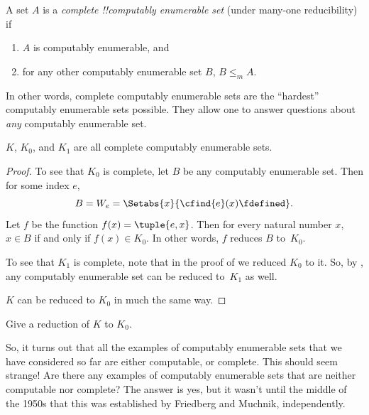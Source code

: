 \documentclass[../../../include/open-logic-section]{subfiles}
\begin{document}

\begin{defn}
A set $A$ is a \emph{complete !!{computably enumerable} set}
(under many-one reducibility) if
\begin{enumerate}
\item $A$ is computably enumerable, and
\item for any other computably enumerable set $B$, $B \leq_m A$.
\end{enumerate}
\end{defn}

In other words, complete computably enumerable sets are the
``hardest'' computably enumerable sets possible. They allow one to
answer questions about \emph{any} computably enumerable set.

\begin{thm}
$K$, $K_0$, and $K_1$ are all complete computably enumerable sets.
\end{thm}

\begin{proof}
To see that $K_0$ is complete, let $B$ be any computably
enumerable set. Then for some index $e$,
\[
B = W_e = \Setabs{x}{\cfind{e}(x) \fdefined}.
\]
Let $f$ be the function $f(x) = \tuple{e, x}$. Then for every natural
number $x$, $x \in B$ if and only if $f(x) \in K_0$. In other words, $f$
reduces $B$ to~$K_0$.

To see that $K_1$ is complete, note that in the proof of
 we reduced $K_0$ to it. So, by
, any computably enumerable set can be
reduced to~$K_1$ as well.

$K$ can be reduced to $K_0$ in much the same way.
\end{proof}

\begin{prob}
Give a reduction of $K$ to $K_0$.
\end{prob}

\begin{digress}
So, it turns out that all the examples of computably enumerable sets
that we have considered so far are either computable, or complete.
This should seem strange!{} Are there any examples of computably
enumerable sets that are neither computable nor complete? The answer
is yes, but it wasn't until the middle of the 1950s that this was
established by Friedberg and Muchnik, independently.
\end{digress}
\end{document}

